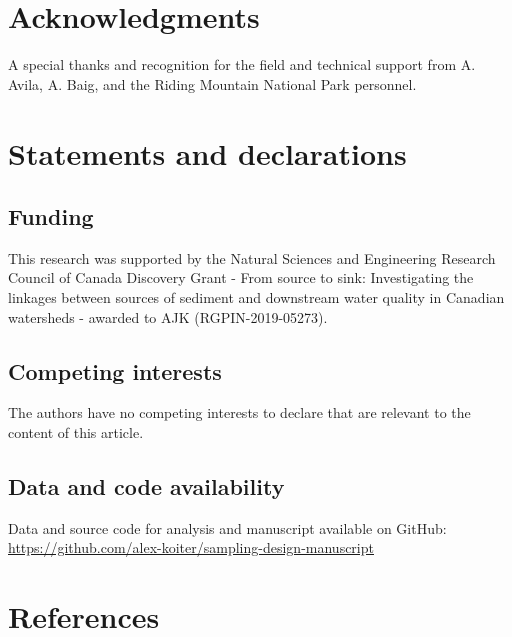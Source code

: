 \documentclass[
  number]{elsarticle}
\begin{document}
\section*{Acknowledgments}\label{acknowledgments}

A special thanks and recognition for the field and technical support
from A. Avila, A. Baig, and the Riding Mountain National Park personnel.

\section*{Statements and
declarations}\label{statements-and-declarations}

\subsection*{Funding}\label{funding}

This research was supported by the Natural Sciences and Engineering
Research Council of Canada Discovery Grant - From source to sink:
Investigating the linkages between sources of sediment and downstream
water quality in Canadian watersheds - awarded to AJK
(RGPIN-2019-05273).

\subsection*{Competing interests}\label{competing-interests}

The authors have no competing interests to declare that are relevant to
the content of this article.

\subsection*{Data and code
availability}\label{data-and-code-availability}

Data and source code for analysis and manuscript available on GitHub:
\url{https://github.com/alex-koiter/sampling-design-manuscript}

\section*{References}\label{references}
\end{document}
